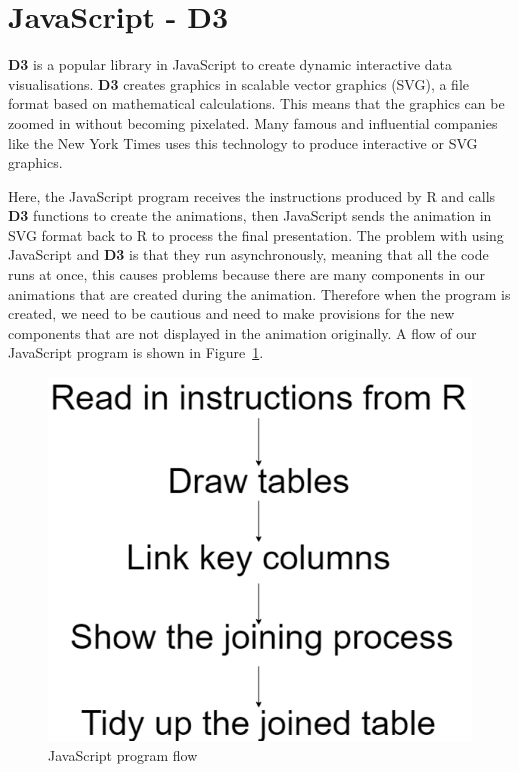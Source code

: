 \section{\textsf{JavaScript} - \textbf{D3}}

\textbf{D3} is a popular library in \textsf{JavaScript} to create dynamic interactive data visualisations. \textbf{D3} creates graphics in scalable vector graphics (SVG), a file format based on mathematical calculations. This means that the graphics can be zoomed in without becoming pixelated.  Many famous and influential companies like the New York Times uses this technology to produce interactive or SVG graphics. 

Here, the \textsf{JavaScript} program receives the instructions produced by \textsf{R} and calls \textbf{D3} functions to create the animations, then \textsf{JavaScript} sends the animation in SVG format back to \textsf{R} to process the final presentation. The problem with using \textsf{JavaScript} and \textbf{D3} is that they run asynchronously, meaning that all the code runs at once, this causes problems because there are many components in our animations that are created during the animation. Therefore when the program is created, we need to be cautious and need to make provisions for the new components that are not displayed in the animation originally. A flow of our \textsf{JavaScript} program is shown in Figure~\ref{fig:jsflow}. \\

\begin{figure}[H]
    \centering
    \includegraphics[scale = 1.0]{Masters-Thesis/img/jsflow.png}
    \caption{\textsf{JavaScript} program flow}
    \label{fig:jsflow}
\end{figure}

